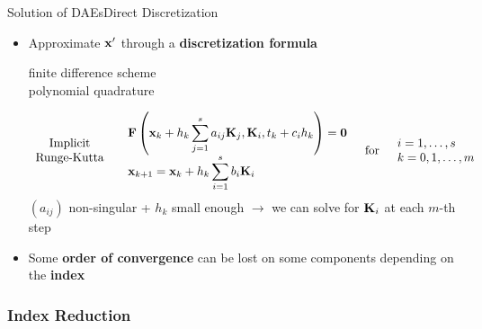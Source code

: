 \begin{frame}{Solution of \aclp{DAE}}{Direct Discretization}
  \begin{itemize}[<+->]
    \item Approximate $\mathbf{x}^\prime$ through a \textbf{discretization formula} \\
    \begin{small}
      \qquad finite difference scheme \\
      \qquad polynomial quadrature
    \end{small}
    \begin{equation*}
      \begin{array}{c}
        \text{Implicit} \\
        \text{Runge-Kutta}
      \end{array}
      \quad
      \begin{array}{l}
        \mathbf{F}\left(\mathbf{x}_{k} + h_k\displaystyle\sum_{j=1}^{s}a_{ij} \mathbf{K}_j, \mathbf{K}_i, t_{k} + c_i h_k\right) = \mathbf{0} \\[0.5em]
        \mathbf{x}_{k+1} = \mathbf{x}_{k} + h_k\displaystyle\sum_{i=1}^{s} b_i \mathbf{K}_i
      \end{array}
      \quad \text{for} \quad
      \begin{array}{l}
        i = 1, \dots, s \\
        k = 0, 1, \dots, m
      \end{array}
    \end{equation*}
    $(a_{ij})$ non-singular + $h_k$ small enough $\rightarrow$ we can solve for $\mathbf{K}_i$ at each $m$-th step
    \item[\textcolor{mycolor3}{\faExclamationTriangle}] Some \textbf{order of convergence} can be lost on some components depending on the \textcolor{mycolor2!95!black}{\textbf{index}}
  \end{itemize}
  \vspace{0.5em}
\end{frame}

\subsubsection{Index Reduction}

